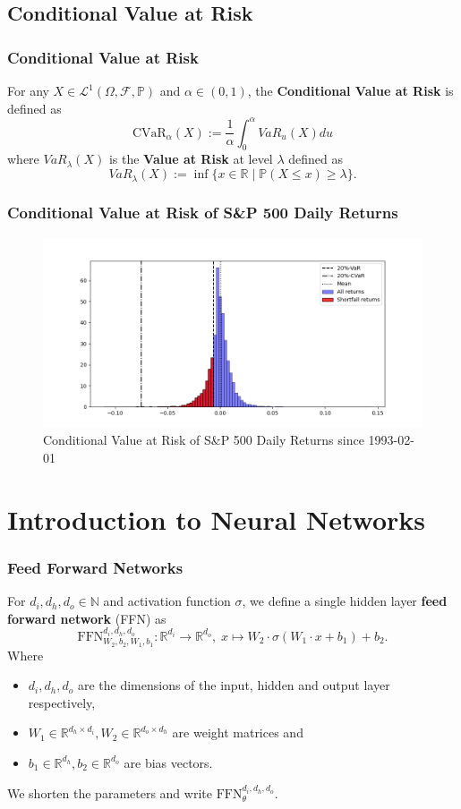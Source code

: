 \documentclass[serif]{beamer}
\def\R{{\mathbb R}}
\def\P{{\mathbb P}}
\def\N{{\mathbb N}}
\def\O{{\Omega}}
\def\cF{{\mathcal F}}
\def\L{{\mathcal L}}
\begin{document}
\subsection{Conditional Value at Risk}

\begin{frame}
    \frametitle{Conditional Value at Risk}
    For any $X \in \L^1 (\O, \cF, \P)$ and $\alpha \in (0,1)$,
    the \textbf{Conditional Value at Risk}
    is defined as
    $$\text{CVaR}_\alpha (X) := \frac{1}{\alpha} \int_0^\alpha VaR_u (X) du$$
    where $VaR_\lambda (X)$ is the \textbf{Value at Risk} at level $\lambda$ defined as
    $$VaR_\lambda (X) := \inf \{ x \in \R \; | \; \P (X \leq x) \geq \lambda \}.$$
\end{frame}

\begin{frame}
    \frametitle{Conditional Value at Risk of S\&P 500 Daily Returns}
    \begin{figure}
        \includegraphics[width=1.0\textwidth]{./images/cvar_sp500_example.png}
        \caption{Conditional Value at Risk of S\&P 500 Daily Returns since 1993-02-01}
    \end{figure}
\end{frame}

\section{Introduction to Neural Networks}

\begin{frame}
    \frametitle{Feed Forward Networks}
    For $d_i, d_h, d_o \in \N$
    and activation function $\sigma$,
    we define a single hidden layer \textbf{feed forward network} (FFN) as
    \[
        \text{FFN}_{W_2, b_2, W_1, b_1}^{d_i, d_h, d_o} : \R^{d_i} \to \R^{d_o}, \;
        x \mapsto W_2 \cdot \sigma (W_1 \cdot x + b_1) + b_2.
    \]
    Where
    \begin{itemize}
        \item $d_i, d_h, d_o$ are the dimensions of the input, hidden and output layer respectively,
        \item $W_1 \in \R^{d_h \times d_i}, W_2 \in \R^{d_o \times d_h}$ are weight matrices and
        \item $b_1 \in \R^{d_h}, b_2 \in \R^{d_o}$ are bias vectors.
    \end{itemize}
    We shorten the parameters and write $\text{FFN}_\theta^{d_i, d_h, d_o}$.
\end{frame}
\end{document}
